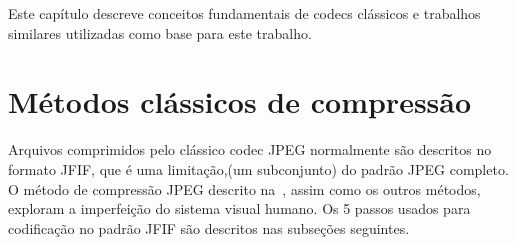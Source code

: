 \newcommand{\texCommand}[1]{\texttt{\textbackslash{#1}}}%

\newcommand{\exemplo}[1]{%
\vspace{\baselineskip}%
\noindent\fbox{\begin{minipage}{\textwidth}#1\end{minipage}}%
\\\vspace{\baselineskip}}%

\newcommand{\exemploVerbatim}[1]{%
\vspace{\baselineskip}%
\noindent\fbox{\begin{minipage}{\textwidth}%
#1\end{minipage}}%
\\\vspace{\baselineskip}}%

Este capítulo descreve conceitos fundamentais de codecs clássicos e trabalhos similares utilizadas como base para este trabalho.
\section{Métodos clássicos de compressão}
Arquivos comprimidos pelo clássico codec JPEG normalmente são descritos no formato \acrshort{JFIF}, que é uma limitação,(um subconjunto) do padrão JPEG completo. 
O método de compressão JPEG descrito na~, assim como os outros métodos, exploram a 
imperfeição do sistema visual humano. Os 5 passos usados para codificação no padrão JFIF são descritos nas subseções seguintes.
